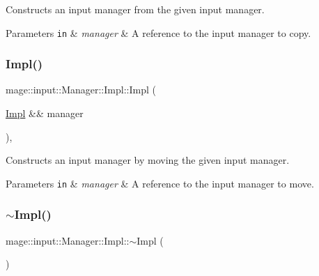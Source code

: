 Constructs an input manager from the given input manager.


\begin{DoxyParams}[1]{Parameters}
\mbox{\tt in}  & {\em manager} & A reference to the input manager to copy. \\
\hline
\end{DoxyParams}
\hypertarget{classmage_1_1input_1_1_manager_1_1_impl_a15372813362704488fc264aa5d784b0e}{}\label{classmage_1_1input_1_1_manager_1_1_impl_a15372813362704488fc264aa5d784b0e} 
\subsubsection{\texorpdfstring{Impl()}{Impl()}\hspace{0.1cm}{\footnotesize\ttfamily [3/3]}}
{\footnotesize\ttfamily mage\+::input\+::\+Manager\+::\+Impl\+::\+Impl (\begin{DoxyParamCaption}\item[{\hyperlink{classmage_1_1input_1_1_manager_1_1_impl}{Impl} \&\&}]{manager }\end{DoxyParamCaption})\hspace{0.3cm}{\ttfamily [default]}, {\ttfamily [noexcept]}}

Constructs an input manager by moving the given input manager.


\begin{DoxyParams}[1]{Parameters}
\mbox{\tt in}  & {\em manager} & A reference to the input manager to move. \\
\hline
\end{DoxyParams}
\hypertarget{classmage_1_1input_1_1_manager_1_1_impl_ac8699aba365e2b08ea6564f8b63b6ae0}{}\label{classmage_1_1input_1_1_manager_1_1_impl_ac8699aba365e2b08ea6564f8b63b6ae0} 
\subsubsection{\texorpdfstring{$\sim$\+Impl()}{~Impl()}}
{\footnotesize\ttfamily mage\+::input\+::\+Manager\+::\+Impl\+::$\sim$\+Impl (\begin{DoxyParamCaption}{ }\end{DoxyParamCaption})\hspace{0.3cm}{\ttfamily [default]}}

